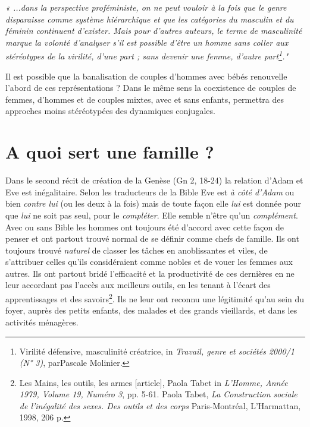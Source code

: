 {\begin{displayquote} \emph{« ...dans la perspective proféministe, on ne peut vouloir à la fois que le genre disparaisse comme système hiérarchique et que les catégories du masculin et du féminin continuent d'exister. Mais pour d'autres auteurs, le terme de masculinité marque la volonté d'analyser s'il est possible d'être un homme sans coller aux stéréotypes de la virilité, d'une part ; sans devenir une femme, d'autre part\footnote{Virilité défensive, masculinité créatrice, in \emph{Travail, genre et sociétés
2000/1 (N° 3)}, parPascale Molinier.}."} 
\end{displayquote}

 
 
 Il est possible que la banalisation de couples d’hommes avec bébés renouvelle l'abord de ces représentations ? Dans le même sens la coexistence de couples de femmes, d’hommes et de couples mixtes, avec et sans enfants, permettra des approches moins stéréotypées des dynamiques conjugales.
 







\section{A quoi sert une famille ?} 




 
 
 Dans le second récit de création de la Genèse (Gn 2, 18-24) la relation d'Adam et Eve est inégalitaire. Selon les traducteurs de la Bible Eve est \emph{à côté d'Adam} ou bien \emph{contre lui} (ou les deux à la fois) mais de toute façon elle \emph{lui} est donnée pour que \emph{lui} ne soit pas seul, pour le \emph{compléter}. Elle semble n'être qu'un \emph{complément}. Avec ou sans Bible les hommes ont toujours été d'accord avec cette façon de penser et ont partout trouvé normal de se définir comme chefs de famille. Ils ont toujours trouvé \emph{naturel} de classer les tâches en anoblissantes et viles, de s'attribuer celles qu'ils considéraient comme nobles et de vouer les femmes aux autres. Ils ont partout bridé l’efficacité et la productivité de ces dernières en ne leur accordant pas l’accès aux meilleurs outils, en les tenant à l’écart des apprentissages et des savoirs\footnote{Les Mains, les outils, les armes [article], Paola Tabet
in \emph{L'Homme, Année 1979, Volume 19, Numéro 3}, pp. 5-61.
Paola Tabet, \emph{La Construction sociale de l’inégalité des sexes. Des outils et des corps}
Paris-Montréal, L’Harmattan, 1998, 206 p.}. Ils ne leur ont reconnu une légitimité qu’au sein du foyer, auprès des petits enfants, des malades et des grands vieillards, et dans les activités ménagères. 

}
